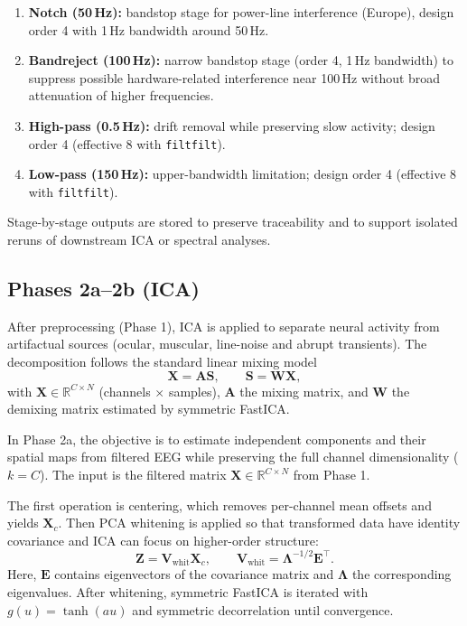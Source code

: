 \begin{enumerate}
\item \textbf{Notch (50\,Hz):} bandstop stage for power-line interference (Europe), design order 4 with 1\,Hz bandwidth around 50\,Hz.
\item \textbf{Bandreject (100\,Hz):} narrow bandstop stage (order 4, 1\,Hz bandwidth) to suppress possible hardware-related interference near 100\,Hz without broad attenuation of higher frequencies.
\item \textbf{High-pass (0.5\,Hz):} drift removal while preserving slow activity; design order 4 (effective 8 with \texttt{filtfilt}).
\item \textbf{Low-pass (150\,Hz):} upper-bandwidth limitation; design order 4 (effective 8 with \texttt{filtfilt}).
\end{enumerate}

Stage-by-stage outputs are stored to preserve traceability and to support isolated reruns of downstream ICA or spectral analyses.

\subsection{Phases 2a--2b (ICA)}

After preprocessing (Phase 1), ICA is applied to separate neural activity from artifactual sources (ocular, muscular, line-noise and abrupt transients). The decomposition follows the standard linear mixing model
\[
\mathbf{X}=\mathbf{A}\mathbf{S},\qquad \mathbf{S}=\mathbf{W}\mathbf{X},
\]
with $\mathbf{X}\in\mathbb{R}^{C\times N}$ (channels $\times$ samples), $\mathbf{A}$ the mixing matrix, and $\mathbf{W}$ the demixing matrix estimated by symmetric FastICA.

In Phase 2a, the objective is to estimate independent components and their spatial maps from filtered EEG while preserving the full channel dimensionality ($k=C$). The input is the filtered matrix $\mathbf{X}\in\mathbb{R}^{C\times N}$ from Phase 1.

The first operation is centering, which removes per-channel mean offsets and yields $\mathbf{X}_c$. Then PCA whitening is applied so that transformed data have identity covariance and ICA can focus on higher-order structure:
\[
\mathbf{Z}=\mathbf{V}_{\text{whit}}\mathbf{X}_c,\qquad \mathbf{V}_{\text{whit}}=\mathbf{\Lambda}^{-1/2}\mathbf{E}^{\top}.
\]
Here, $\mathbf{E}$ contains eigenvectors of the covariance matrix and $\mathbf{\Lambda}$ the corresponding eigenvalues. After whitening, symmetric FastICA is iterated with $g(u)=\tanh(au)$ and symmetric decorrelation until convergence.


